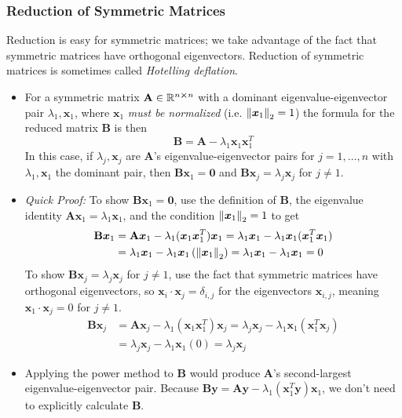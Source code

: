 \documentclass[11pt, a4paper]{article}
\newcommand{\R}{\mathbb{R}} %
\newcommand{\mat}[1]{\mathbf{#1}} %
\begin{document}
\subsubsection{Reduction of Symmetric Matrices} 
Reduction is easy for symmetric matrices; we take advantage of the fact that symmetric matrices have orthogonal eigenvectors. Reduction of symmetric matrices is sometimes called \textit{Hotelling deflation}. 
\begin{itemize}
	\item For a symmetric matrix $ \mat{A} \in \R^{n\cross n} $ with a dominant eigenvalue-eigenvector pair $ \lambda_1, \bm{x}_1 $, where $ \bm{x}_{1} $ \textit{must be normalized} (i.e. $ \norm{\bm{x}_{1}}_{2} = 1 $) the formula for the reduced matrix $ \mat{B} $ is then
	\begin{equation*}
		\mat{B} = \mat{A} - \lambda_{1} \bm{x}_1 \bm{x}_{1}^T
	\end{equation*}
	In this case, if $ \lambda_{j}, \bm{x}_{j} $ are $ \mat{A} $'s eigenvalue-eigenvector pairs for $ j = 1, \dots, n $ with $ \lambda_1, \bm{x}_1 $ the dominant pair, then $ \mat{B} \bm{x}_{1} = \bm{0} $ and $ \mat{B}\bm{x}_{j} = \lambda_{j} \bm{x}_{j}  $ for $ j \neq 1 $.
	
	\item \textit{Quick Proof:} To show $ \mat{B} \bm{x}_{1} = \bm{0} $, use the definition of $ \mat{B} $, the eigenvalue identity $ \mat{A} \bm{x}_{1} = \lambda_{1}\bm{x}_{1}$, and the condition $ \norm{\bm{x}_{1}}_{2} = 1  $ to get
	\begin{align*}
		\mat{B}\bm{x}_{1} &= \mat{A}\bm{x}_{1} - \lambda_{1} (\bm{x}_1 \bm{x}_{1}^T)\bm{x}_{1} = \lambda_{1}\bm{x}_{1} - \lambda_{1} \bm{x}_1 (\bm{x}_{1}^T\bm{x}_{1})\\
		& = \lambda_{1}\bm{x}_{1} - \lambda_{1} \bm{x}_1 \left (\norm{\bm{x}_{1}}_{2}\right )  = \lambda_{1}\bm{x}_{1} - \lambda_{1} \bm{x}_1  = 0
	\end{align*}
	To show $ \mat{B}\bm{x}_{j} = \lambda_{j} \bm{x}_{j}  $ for $ j \neq 1 $, use the fact that symmetric matrices have orthogonal eigenvectors, so $ \bm{x}_{i} \cdot \bm{x}_{j} = \delta_{i, j} $ for the eigenvectors $ \bm{x}_{i, j} $, meaning $ \bm{x}_{1} \cdot \bm{x}_{j} = 0 $ for $ j \neq 1 $.
	\begin{align*}
		\mat{B}\bm{x}_{j} &= \mat{A}\bm{x}_{j} - \lambda_{1} (\bm{x}_1 \bm{x}_{1}^T)\bm{x}_{j} = \lambda_{j}\bm{x}_{j} - \lambda_{1} \bm{x}_1 (\bm{x}_{1}^T\bm{x}_{j})\\
		& = \lambda_{j}\bm{x}_{j} - \lambda_{1} \bm{x}_1 (0) = \lambda_{j}\bm{x}_{j}
	\end{align*}	
	
	\item Applying the power method to $ \mat{B} $ would produce $ \mat{A} $'s second-largest eigenvalue-eigenvector pair. Because $ \mat{B}\bm{y} = \mat{A}\mat{y} - \lambda_{1}(\bm{x}_{1}^{T}\bm{y})\bm{x}_{1}$, we don't need to explicitly calculate $ \mat{B} $.
	

\end{itemize}
\end{document}
